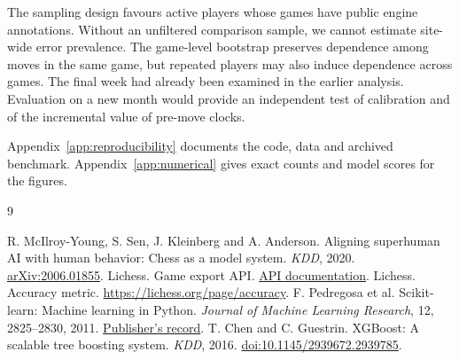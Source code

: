 \documentclass[10pt,a4paper]{article}
\begin{document}
The sampling design favours active players whose games have public engine annotations. Without an unfiltered comparison sample, we cannot estimate site-wide error prevalence. The game-level bootstrap preserves dependence among moves in the same game, but repeated players may also induce dependence across games. The final week had already been examined in the earlier analysis. Evaluation on a new month would provide an independent test of calibration and of the incremental value of pre-move clocks.

Appendix~\ref{app:reproducibility} documents the code, data and archived benchmark. Appendix~\ref{app:numerical} gives exact counts and model scores for the figures.

\begin{thebibliography}{9}\small\raggedright\setlength{\itemsep}{1pt}\setlength{\parskip}{0pt}
 R. McIlroy-Young, S. Sen, J. Kleinberg and A. Anderson. Aligning superhuman AI with human behavior: Chess as a model system. \emph{KDD}, 2020. \href{https://arxiv.org/abs/2006.01855}{arXiv:2006.01855}.
 Lichess. Game export API. \href{https://lichess.org/api#tag/Games}{API documentation}.
 Lichess. Accuracy metric. \url{https://lichess.org/page/accuracy}.
 F. Pedregosa et al. Scikit-learn: Machine learning in Python. \emph{Journal of Machine Learning Research}, 12, 2825--2830, 2011. \href{https://www.jmlr.org/papers/v12/pedregosa11a.html}{Publisher's record}.
 T. Chen and C. Guestrin. XGBoost: A scalable tree boosting system. \emph{KDD}, 2016. \href{https://doi.org/10.1145/2939672.2939785}{doi:10.1145/2939672.2939785}.
\end{thebibliography}
\clearpage
\appendix
{}

\clearpage

\end{document}
